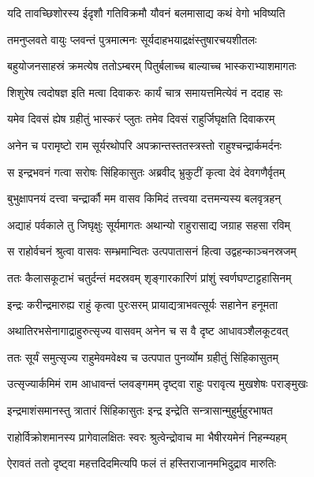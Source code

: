 \twolineshloka
{यदि तावच्छिशोरस्य ईदृशौ गतिविक्रमौ}
{यौवनं बलमासाद्य कथं वेगो भविष्यति} %

\twolineshloka
{तमनुप्लवते वायुः प्लवन्तं पुत्रमात्मनः}
{सूर्यदाहभयाद्रक्षंस्तुषारचयशीतलः} %

\twolineshloka
{बहुयोजनसाहस्रं क्रमत्येष ततोऽम्बरम्}
{पितुर्बलाच्च बाल्याच्च भास्कराभ्याशमागतः} %

\twolineshloka
{शिशुरेष त्वदोषज्ञ इति मत्वा दिवाकरः}
{कार्यं चात्र समायत्तमित्येवं न ददाह सः} %

\twolineshloka
{यमेव दिवसं ह्येष ग्रहीतुं भास्करं प्लुतः}
{तमेव दिवसं राहुर्जिघृक्षति दिवाकरम्} %

\twolineshloka
{अनेन च परामृष्टो राम सूर्यरथोपरि}
{अपक्रान्तस्ततस्त्रस्तो राहुश्चन्द्रार्कमर्दनः} %

\twolineshloka
{स इन्द्रभवनं गत्वा सरोषः सिंहिकासुतः}
{अब्रवीद् भ्रुकुटीं कृत्वा देवं देवगणैर्वृतम्} %

\twolineshloka
{बुभुक्षापनयं दत्त्वा चन्द्रार्कौ मम वासव}
{किमिदं तत्त्वया दत्तमन्यस्य बलवृत्रहन्} %

\twolineshloka
{अद्याहं पर्वकाले तु जिघृक्षुः सूर्यमागतः}
{अथान्यो राहुरासाद्य जग्राह सहसा रविम्} %

\twolineshloka
{स राहोर्वचनं श्रुत्वा वासवः सम्भ्रमान्वितः}
{उत्पपातासनं हित्वा उद्वहन्काञ्चनस्रजम्} %

\twolineshloka
{ततः कैलासकूटाभं चतुर्दन्तं मदस्रवम्}
{शृङ्गारकारिणं प्रांशुं स्वर्णघण्टाट्टहासिनम्} %

\twolineshloka
{इन्द्रः करीन्द्रमारुह्य राहुं कृत्वा पुरःसरम्}
{प्रायाद्यत्राभवत्सूर्यः सहानेन हनूमता} %

\twolineshloka
{अथातिरभसेनागाद्राहुरुत्सृज्य वासवम्}
{अनेन च स वै दृष्ट आधावञ्शैलकूटवत्} %

\twolineshloka
{ततः सूर्यं समुत्सृज्य राहुमेवमवेक्ष्य च}
{उत्पपात पुनर्व्योम ग्रहीतुं सिंहिकासुतम्} %

\twolineshloka
{उत्सृज्यार्कमिमं राम आधावन्तं प्लवङ्गमम्}
{दृष्ट्वा राहुः परावृत्य मुखशेषः पराङ्मुखः} %

\twolineshloka
{इन्द्रमाशंसमानस्तु त्रातारं सिंहिकासुतः}
{इन्द्र इन्द्रेति सन्त्रासान्मुहुर्मुहुरभाषत} %

\twolineshloka
{राहोर्विक्रोशमानस्य प्रागेवालक्षितः स्वरः}
{श्रुत्वेन्द्रोवाच मा भैषीरयमेनं निहन्म्यहम्} %

\twolineshloka
{ऐरावतं ततो दृष्ट्वा महत्तदिदमित्यपि}
{फलं तं हस्तिराजानमभिदुद्राव मारुतिः} %

